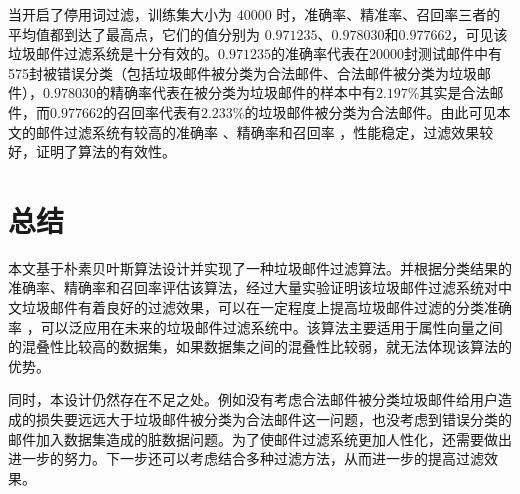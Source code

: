 \documentclass[UTF8,zihao=-4]{ctexart}
\begin{document}
	当开启了停用词过滤，训练集大小为 40000 时，准确率、精准率、召回率三者的平均值都到达了最高点，它们的值分别为 $0.971235$、$0.978030$和$0.977662$，可见该垃圾邮件过滤系统是十分有效的。$0.971235$的准确率代表在20000封测试邮件中有575封被错误分类（包括垃圾邮件被分类为合法邮件、合法邮件被分类为垃圾邮件），$0.978030$的精确率代表在被分类为垃圾邮件的样本中有$2.197\%$其实是合法邮件，而$0.977662$的召回率代表有$2.233\%$的垃圾邮件被分类为合法邮件。由此可见本文的邮件过滤系统有较高的准确率 、精确率和召回率 ，性能稳定，过滤效果较好，证明了算法的有效性。

\newpage
\section*{总结}
	本文基于朴素贝叶斯算法设计并实现了一种垃圾邮件过滤算法。并根据分类结果的准确率、精确率和召回率评估该算法，经过大量实验证明该垃圾邮件过滤系统对中文垃圾邮件有着良好的过滤效果，可以在一定程度上提高垃圾邮件过滤的分类准确率
，可以泛应用在未来的垃圾邮件过滤系统中。该算法主要适用于属性向量之间的混叠性比较高的数据集，如果数据集之间的混叠性比较弱，就无法体现该算法的优势。
	
	同时，本设计仍然存在不足之处。例如没有考虑合法邮件被分类垃圾邮件给用户造成的损失要远远大于垃圾邮件被分类为合法邮件这一问题，也没考虑到错误分类的邮件加入数据集造成的脏数据问题。为了使邮件过滤系统更加人性化，还需要做出进一步的努力。下一步还可以考虑结合多种过滤方法，从而进一步的提高过滤效果。
	
\end{document}
